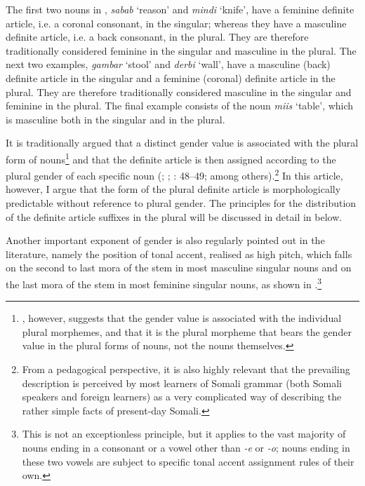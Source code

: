 \documentclass[output=paper]{langsci/langscibook}
\begin{document}
The first two nouns in , \textit{sabab} ‘reason’ and \textit{mindi} ‘knife’, have a feminine definite article, i.e. a coronal consonant, in the singular; whereas they have a masculine definite article, i.e. a back consonant, in the plural. They are therefore traditionally considered feminine in the singular and masculine in the plural. The next two examples, \textit{gambar} ‘stool’ and \textit{derbi} ‘wall’, have a masculine (back) definite article in the singular and a feminine (coronal) definite article in the plural. They are therefore traditionally considered masculine in the singular and feminine in the plural. The final example consists of the noun \textit{miis} ‘table’, which is masculine both in the singular and in the plural.

It is traditionally argued that a distinct gender value is associated with the plural form of nouns\footnote{\citet{Lecarme2002}, however, suggests that the gender value is associated with the individual plural morphemes, and that it is the plural morpheme that bears the gender value in the plural forms of nouns, not the nouns themselves.} and that the definite article is then assigned according to the plural gender of each specific noun (\citealt{ElSolamiMewis1988}; \citealt[54--55]{Saeed1999}; \citealt[48--49]{Berchem2012}: 48--49; among others).\footnote{From a pedagogical perspective, it is also highly relevant that the prevailing description is perceived by most learners of Somali grammar (both Somali speakers and foreign learners) as a very complicated way of describing the rather simple facts of present-day Somali.}  In this article, however, I argue that the form of the plural definite article is morphologically predictable without reference to plural gender. The principles for the distribution of the definite article suffixes in the plural will be discussed in detail in  below.

Another important exponent of gender is also regularly pointed out in the literature, namely the position of tonal accent, realised as high pitch, which falls on the second to last mora of the stem in most masculine singular nouns and on the last mora of the stem in most feminine singular nouns, as shown in .\footnote{This is not an exceptionless principle, but it applies to the vast majority of nouns ending in a consonant or a vowel other than \textit{-e} or \textit{-o}; nouns ending in these two vowels are subject to specific tonal accent assignment rules of their own.}
 
\end{document}
